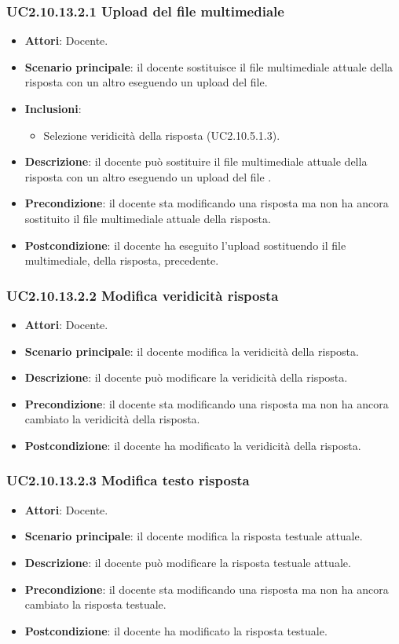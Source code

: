 \subsubsection{UC2.10.13.2.1 Upload del file multimediale}
\begin{itemize}
\item \textbf{Attori}: Docente.
\item \textbf{Scenario principale}: il docente sostituisce il file multimediale attuale della risposta con un altro eseguendo un upload del file.
\item \textbf{Inclusioni}:
\begin{itemize}
\item Selezione veridicità della risposta (UC2.10.5.1.3).
\end{itemize}
\item \textbf{Descrizione}: il docente può sostituire il file multimediale attuale della risposta con un altro eseguendo un upload del file
.
\item \textbf{Precondizione}: il docente sta modificando una risposta ma non ha ancora sostituito il file multimediale attuale della risposta.
\item \textbf{Postcondizione}: il docente ha eseguito l'upload sostituendo il file multimediale, della risposta, precedente.
\end{itemize}
\subsubsection{UC2.10.13.2.2 Modifica veridicità risposta}
\begin{itemize}
\item \textbf{Attori}: Docente.
\item \textbf{Scenario principale}: il docente modifica la veridicità della risposta.
\item \textbf{Descrizione}: il docente può modificare la veridicità della risposta.
\item \textbf{Precondizione}: il docente sta modificando una risposta ma non ha ancora cambiato la veridicità della risposta.
\item \textbf{Postcondizione}: il docente ha modificato la veridicità della risposta.
\end{itemize}
\subsubsection{UC2.10.13.2.3 Modifica testo risposta}
\begin{itemize}
\item \textbf{Attori}: Docente.
\item \textbf{Scenario principale}: il docente modifica la risposta testuale attuale.
\item \textbf{Descrizione}: il docente può modificare la risposta testuale attuale.
\item \textbf{Precondizione}: il docente sta modificando una risposta ma non ha ancora cambiato la risposta testuale.
\item \textbf{Postcondizione}: il docente ha modificato la risposta testuale.
\end{itemize}
